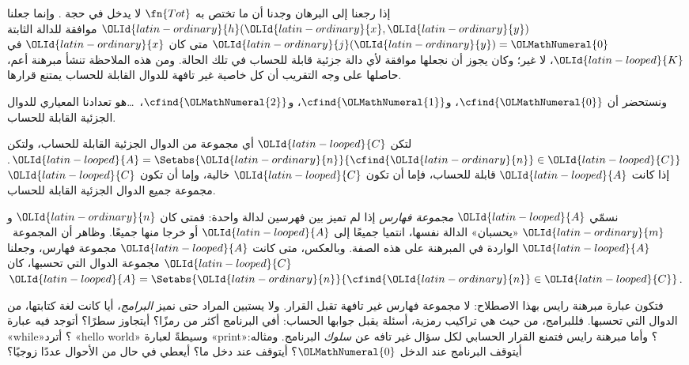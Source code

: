 \documentclass[../../../include/open-logic-section]{subfiles}
\begin{document}

إذا رجعنا إلى البرهان وجدنا أن ما تختص به $\fn{Tot}$ لا يدخل
في حجة . وإنما جعلنا ${\OLId{latin-ordinary}{h}}({\OLId{latin-ordinary}{x}},{\OLId{latin-ordinary}{y}})$ موافقة
للدالة الثابتة ${\OLId{latin-ordinary}{j}}({\OLId{latin-ordinary}{y}})={\OLMathNumeral{0}}$ متى كان ${\OLId{latin-ordinary}{x}}$ في ${\OLId{latin-looped}{K}}$، لا غير؛ وكان
يجوز أن نجعلها موافقة لأي دالة جزئية قابلة
للحساب في تلك الحالة. ومن هذه الملاحظة تنشأ مبرهنة أعم، حاصلها على وجه
التقريب أن كل خاصية غير تافهة للدوال القابلة للحساب
يمتنع قرارها.

ونستحضر أن $\cfind{{\OLMathNumeral{0}}}$، و$\cfind{{\OLMathNumeral{1}}}$، و$\cfind{{\OLMathNumeral{2}}}$،~\dots هو تعدادنا
المعياري للدوال الجزئية القابلة للحساب.

\begin{thm}
  لتكن ${\OLId{latin-looped}{C}}$ أي مجموعة من الدوال الجزئية القابلة للحساب، ولتكن ${\OLId{latin-looped}{A}} =
  \Setabs{{\OLId{latin-ordinary}{n}}}{\cfind{{\OLId{latin-ordinary}{n}}} \in {\OLId{latin-looped}{C}}}$. إذا كانت ${\OLId{latin-looped}{A}}$ قابلة للحساب، فإما أن
  تكون ${\OLId{latin-looped}{C}}$ خالية، وإما أن تكون ${\OLId{latin-looped}{C}}$ مجموعة جميع الدوال الجزئية
  القابلة للحساب.
\end{thm}

نسمّي ${\OLId{latin-looped}{A}}$ \emph{مجموعة فهارس} إذا لم تميز بين فهرسين لدالة واحدة:
فمتى كان ${\OLId{latin-ordinary}{n}}$ و${\OLId{latin-ordinary}{m}}$ «يحسبان» الدالة نفسها، انتميا جميعًا
إلى ${\OLId{latin-looped}{A}}$ أو خرجا منها جميعًا. وظاهر أن
المجموعة~${\OLId{latin-looped}{A}}$ الواردة في المبرهنة على هذه الصفة. وبالعكس، متى كانت ${\OLId{latin-looped}{A}}$
مجموعة فهارس، وجعلنا ${\OLId{latin-looped}{C}}$ مجموعة الدوال التي تحسبها، كان
${\OLId{latin-looped}{A}} = \Setabs{{\OLId{latin-ordinary}{n}}}{\cfind{{\OLId{latin-ordinary}{n}}} \in {\OLId{latin-looped}{C}}}$.

\begin{explain}
فتكون عبارة مبرهنة رايس بهذا الاصطلاح: لا مجموعة فهارس غير تافهة
تقبل القرار. ولا يستبين المراد حتى نميز
\emph{البرامج}، أيا كانت لغة كتابتها، من الدوال
التي تحسبها. فللبرامج، من حيث هي تراكيب رمزية،
أسئلة يقبل جوابها الحساب: أفي البرنامج أكثر من  رمزًا؟ أيتجاوز 
سطرًا؟ أتوجد فيه عبارة «while»؟ أترد «hello world» وسيطةً
لعبارة «print»؟ وأما مبرهنة رايس فتمنع القرار الحسابي لكل سؤال غير تافه عن
\emph{سلوك} البرنامج. ومثاله: أيتوقف
البرنامج عند الدخل ${\OLMathNumeral{0}}$؟ أيتوقف عند دخل ما؟ أيعطي في حال من الأحوال عددًا زوجيًا؟
\end{explain}
\end{document}

